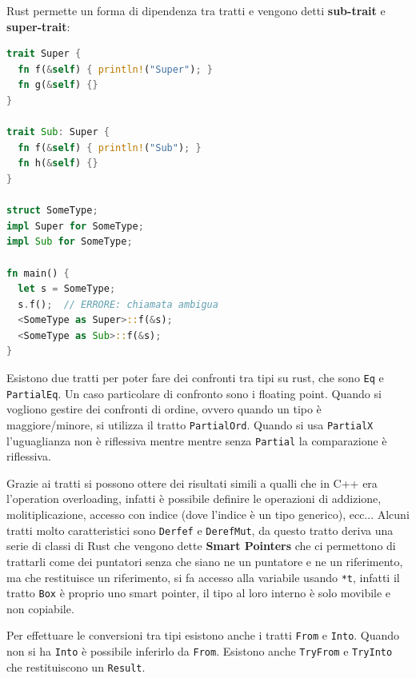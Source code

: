 \documentclass[12pt]{article}
\begin{document}
Rust permette un forma di dipendenza tra tratti e vengono detti \textbf{sub-trait} e \textbf{super-trait}:
\begin{lstlisting}[language=rust]
trait Super {
  fn f(&self) { println!("Super"); }
  fn g(&self) {}
}

trait Sub: Super {
  fn f(&self) { println!("Sub"); }
  fn h(&self) {} 
}

struct SomeType;
impl Super for SomeType;
impl Sub for SomeType;

fn main() {
  let s = SomeType;
  s.f();  // ERRORE: chiamata ambigua
  <SomeType as Super>::f(&s);
  <SomeType as Sub>::f(&s);
}
\end{lstlisting}

Esistono due tratti per poter fare dei confronti tra tipi su rust, che sono \texttt{Eq} e \texttt{PartialEq}. Un caso particolare di confronto sono i floating point. Quando si vogliono gestire dei confronti di ordine, ovvero quando un tipo \`e maggiore/minore, si utilizza il tratto \texttt{PartialOrd}. Quando si usa \texttt{PartialX} l'uguaglianza non \`e riflessiva mentre mentre senza \texttt{Partial} la comparazione \`e riflessiva.

Grazie ai tratti si possono ottere dei risultati simili a qualli che in C++ era l'operation overloading, infatti \`e possibile definire le operazioni di addizione, molitiplicazione, accesso con indice (dove l'indice \`e un tipo generico), ecc... Alcuni tratti molto caratteristici sono \texttt{Derfef} e \texttt{DerefMut}, da questo tratto deriva una serie di classi di Rust che vengono dette \textbf{Smart Pointers} che ci permettono di trattarli come dei puntatori senza che siano ne un puntatore e ne un riferimento, ma che restituisce un riferimento, si fa accesso alla variabile usando \texttt{*t}, infatti il tratto \texttt{Box} \`e proprio uno smart pointer, il tipo al loro interno \`e solo movibile e non copiabile.

Per effettuare le conversioni tra tipi esistono anche i tratti \texttt{From} e \texttt{Into}. Quando non si ha \texttt{Into} \`e possibile inferirlo da \texttt{From}. Esistono anche \texttt{TryFrom} e \texttt{TryInto} che restituiscono un \texttt{Result}.
\end{document}
